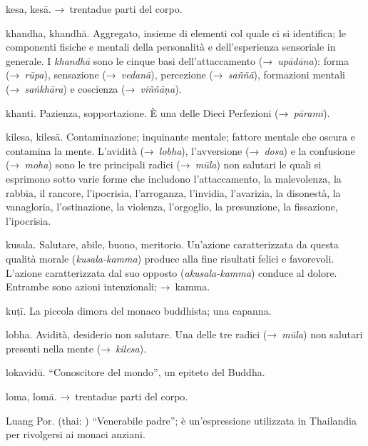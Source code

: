 \begin{glossarydescription}
\item[kesa, kesā.] →~trentadue parti del corpo.

\item[khandha, khandhā.] Aggregato, insieme di elementi col quale ci si
  identifica; le componenti fisiche e mentali della personalità e
  dell'esperienza sensoriale in generale. I \emph{khandhā} sono le cinque basi
  dell'attaccamento (→~\emph{upādāna}): forma (→~\emph{rūpa}), sensazione
  (→~\emph{vedanā}), percezione (→~\emph{saññā}), formazioni mentali
  (→~\emph{saṅkhāra}) e coscienza (→~\emph{viññāṇa}).

\item[khanti.] Pazienza, sopportazione. È una delle Dieci Perfezioni
  (→~\emph{pāramī}).

\item[kilesa, kilesā.] Contaminazione; inquinante mentale; fattore mentale
  che oscura e contamina la mente. L'avidità (→~\emph{lobha}), l'avversione
  (→~\emph{dosa}) e la confusione (→~\emph{moha}) sono le tre principali radici
  (→~\emph{mūla}) non salutari le quali si esprimono sotto varie forme che
  includono l'attaccamento, la malevolenza, la rabbia, il rancore, l'ipocrisia,
  l'arroganza, l'invidia, l'avarizia, la disonestà, la vanagloria,
  l'ostinazione, la violenza, l'orgoglio, la presunzione, la fissazione,
  l'ipocrisia.

\item[kusala.] Salutare, abile, buono, meritorio. Un'azione caratterizzata
  da questa qualità morale (\emph{kusala-kamma}) produce alla fine risultati
  felici e favorevoli. L'azione caratterizzata dal suo opposto
  (\emph{akusala-kamma}) conduce al dolore. Entrambe sono azioni intenzionali;
  →~kamma.

\item[kuṭī.] La piccola dimora del monaco buddhista; una capanna.


\item[lobha.] Avidità, desiderio non salutare. Una delle tre radici
  (→~\emph{mūla}) non salutari presenti nella mente (→~\emph{kilesa}).

\item[lokavidū.] ``Conoscitore del mondo'', un epiteto del Buddha.

\item[loma, lomā.] →~trentadue parti del corpo.

\item[Luang Por.] (thai: ) ``Venerabile padre''; è un'espressione
  utilizzata in Thailandia per rivolgersi ai monaci anziani.


\end{glossarydescription}
